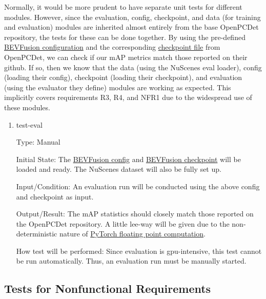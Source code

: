 \documentclass[12pt, titlepage]{article}
\begin{document}
Normally, it would be more prudent to have separate unit tests for different modules. However, 
since the evaluation, config, checkpoint, and data (for training and evaluation) modules are inherited almost entirely from the 
base OpenPCDet repository, the tests for these can be done together. By using the pre-defined \href{https://github.com/open-mmlab/OpenPCDet/blob/master/tools/cfgs/nuscenes_models/bevfusion.yaml}{BEVFusion configuration} and 
the corresponding \href{https://drive.google.com/file/d/1X50b-8immqlqD8VPAUkSKI0Ls-4k37g9/view}{checkpoint file} from OpenPCDet, we can check if our mAP metrics match those reported on their github.
If so, then we know that the data (using the NuScenes eval loader), config (loading their config), checkpoint (loading their checkpoint), 
and evaluation (using the evaluator they define) modules are working as expected. This implicitly covers requirements R3, R4, and NFR1 due to the widespread use of these modules.

\begin{enumerate}

\item{test-eval\\}

Type: Manual
					
Initial State: The \href{https://github.com/open-mmlab/OpenPCDet/blob/master/tools/cfgs/nuscenes_models/bevfusion.yaml}{BEVFusion config} and \href{https://drive.google.com/file/d/1X50b-8immqlqD8VPAUkSKI0Ls-4k37g9/view}{BEVFusion checkpoint} will be loaded and ready. The NuScenes dataset will also be fully set up.
					
Input/Condition: An evaluation run will be conducted using the above config and checkpoint as input. 
					
Output/Result: The mAP statistics should closely match those reported on the OpenPCDet repository. A little lee-way will be given due to the non-deterministic 
nature of \href{https://pytorch.org/docs/stable/notes/numerical_accuracy.html}{PyTorch floating point computation}. 

How test will be performed: Since evaluation is gpu-intensive, this test cannot be run automatically. Thus, an evaluation run must be manually started.

\end{enumerate}


\subsection{Tests for Nonfunctional Requirements}
\end{document}
